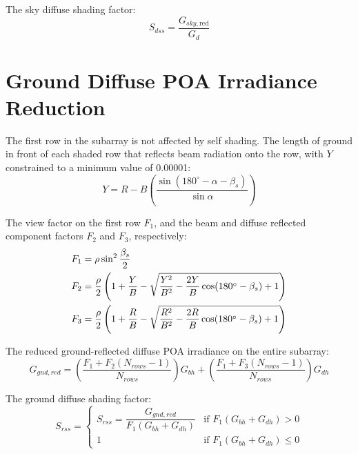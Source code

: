 \documentclass[12pt,letterpaper]{article}
\begin{document}
The sky diffuse shading factor:
\begin{equation}
S_{dss} = \frac{G_{sky,\text{red}}}{G_d}
\end{equation}

\section{Ground Diffuse POA Irradiance Reduction} \label{sec-selfshadgndred}


The first row in the subarray is not affected by self shading. The length of ground in front of each shaded row that reflects beam radiation onto the row, with $Y$ constrained to a minimum value of 0.00001:
\begin{equation}
Y = R - B \left(\frac{\sin( 180^\circ - \alpha - \beta_s )}{\sin\alpha} \right)
\end{equation}

The view factor on the first row $\mathit{F_1}$, and the beam and diffuse reflected component factors $\mathit{F_2}$ and $\mathit{F_3}$, respectively:
\begin{align}
F_1 &= \mathit{\rho} \sin^2\frac{\beta_s}{2} \notag\\
F_2 &= \frac{\mathit{\rho}}{2} \left( 1 + \frac{Y}{B} - \sqrt{ \frac{Y^2}{B^2} - \frac{2Y}{B} \cos(180^\circ - \beta_s) + 1 }\right) \notag\\
F_3 &= \frac{\mathit{\rho}}{2} \left( 1 + \frac{R}{B} - \sqrt{ \frac{R^2}{B^2} - \frac{2R}{B} \cos(180^\circ - \beta_s) + 1 } \right)
\end{align}

The reduced ground-reflected diffuse POA irradiance on the entire subarray:
\begin{equation}
G_{gnd,red}=\left(\frac{F_1+F_2(N_{rows}-1)}{N_{rows}}\right)G_{bh}+\left(\frac{F_1+F_3(N_{rows}-1)}{N_{rows}}\right)G_{dh}
\end{equation}

The ground diffuse shading factor:
\[
S_{rss}=
 \left\{
     \begin{array}{ll}
      S_{rss} = \dfrac{G_{gnd,red}}{F_1 (G_{bh} +  G_{dh})}
      & \mbox{if $F_1 (G_{bh} + G_{dh}) > 0$}\\
      1 
      & \mbox{if $F_1 (G_{bh} + G_{dh}) \leq 0$}
    \end{array}
  \right.
\]
\end{document}
